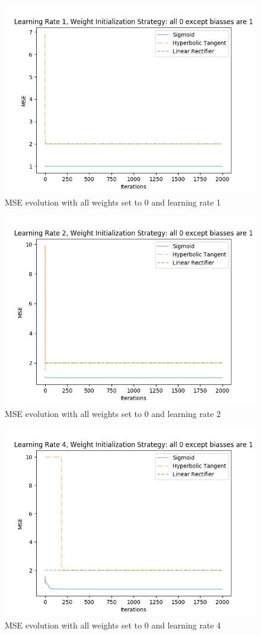 \documentclass{article}
\begin{document}
\begin{figure}[H]
\centering
\includegraphics[width=0.9\linewidth]{img/mse_all0exceptbiassesare1_1.png}
\caption{MSE evolution with all weights set to 0 and learning rate 1}
\label{fig:mse12}
\end{figure}
\begin{figure}[H]
\centering
\includegraphics[width=0.9\linewidth]{img/mse_all0exceptbiassesare1_2.png}
\caption{MSE evolution with all weights set to 0 and learning rate 2}
\label{fig:mse22}
\end{figure}
\begin{figure}[H]
\centering
\includegraphics[width=0.9\linewidth]{img/mse_all0exceptbiassesare1_4.png}
\caption{MSE evolution with all weights set to 0 and learning rate 4}
\label{fig:mse24}
\end{figure}
\end{document}
